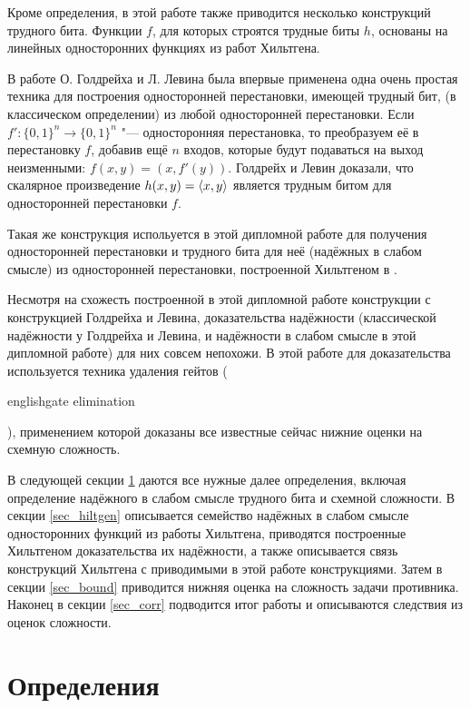 \documentclass[a4paper, 14pt]{extarticle}
\begin{document}
Кроме определения, в этой работе также приводится несколько конструкций трудного
бита. Функции $f$, для которых строятся трудные биты $h$, основаны на линейных
односторонних функциях из работ Хильтгена.

В работе О. Голдрейха и Л. Левина \cite{goldreich_levin} была впервые применена
одна очень простая техника для построения односторонней перестановки, имеющей
трудный бит, (в классическом определении) из любой односторонней перестановки.
Если $f' : \{0, 1\}^n \to \{0, 1\}^n$ "--- односторонняя перестановка, то
преобразуем её в перестановку $f$, добавив ещё $n$ входов, которые будут
подаваться на выход неизменными: $f(x, y) = (x, f'(y))$. Голдрейх и Левин
доказали, что скалярное произведение $h(x, y) = \langle x, y\rangle$ является трудным
битом для односторонней перестановки $f$.

Такая же конструкция испольуется в этой дипломной работе для получения
односторонней перестановки и трудного бита для неё (надёжных в слабом смысле) из
односторонней перестановки, построенной Хильтгеном в \cite{hiltgen1993}.

Несмотря на схожесть построенной в этой дипломной работе конструкции с
конструкцией Голдрейха и Левина, доказательства надёжности (классической
надёжности у Голдрейха и Левина, и надёжности в слабом смысле в этой
дипломной работе) для них совсем непохожи. В этой работе для доказательства
используется техника удаления гейтов (\begin{foreignlanguage}{english}gate
elimination\end{foreignlanguage}), применением которой доказаны все известные
сейчас нижние оценки на схемную сложность.

В следующей секции \ref{sec_defs} даются все нужные далее определения, включая
определение надёжного в слабом смысле трудного бита и схемной сложности.
В секции \ref{sec_hiltgen} описывается семейство надёжных в слабом смысле
односторонних функций из работы Хильтгена, приводятся построенные Хильтгеном
доказательства их надёжности, а также описывается связь конструкций Хильтгена
с приводимыми в этой работе конструкциями. Затем в секции \ref{sec_bound}
приводится нижняя оценка на сложность задачи противника. Наконец в секции
\ref{sec_corr} подводится итог работы и описываются следствия из оценок
сложности.

\section{Определения}
\label{sec_defs}
\end{document}
